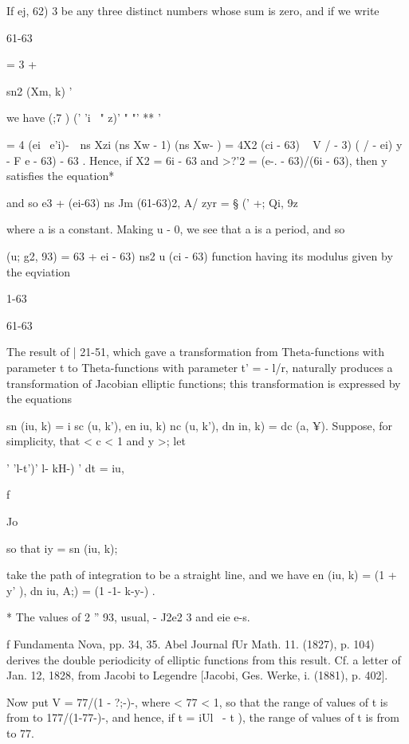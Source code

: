 If ej, 62) 3 be any three distinct numbers whose sum is
zero, and if we write

61-63

  = 3 +

sn2 (Xm, k) '

we have (;7 ) (' 'i ~" z)' " "' ** '

= 4 (ei ~e'i)-\ \ ns Xzi (ns Xw - 1) (ns Xw- ) = 4X2 (ci - 63) ~ V / -
3) ( / - ei) y - F e - 63) - 63 . Hence, if X2 = 6i - 63 and >?'2 =
(e-. - 63)/(6i - 63), then y satisfies the equation*

and so e3 + (ei-63) ns Jm (61-63)2, A/ zyr = § (' +; Qi, 9z\

where a is a constant. Making u - 0, we see that a is a period, and so

  (u; g2, 93) = 63 + ei - 63) ns2 u (ci - 63)%
function having its modulus given by the eqviation

1-63

61-63

The result of | 21-51, which gave a transformation from
Theta-functions with parameter t to Theta-functions with parameter t'
= - l/r, naturally produces a transformation of Jacobian elliptic
functions; this transformation is expressed by the equations

sn (iu, k) = i sc (u, k'), en iu, k) nc (u, k'), dn in, k) = dc (a,
¥). Suppose, for simplicity, that < c < 1 and y >; let

' 'l-t')' l- kH-) ' dt = iu,

f

Jo

so that iy = sn (iu, k);

take the path of integration to be a straight line, and we have en
(iu, k) = (1 + y' ), dn iu, A;) = (1 -1- k-y-) .

* The values of 2 '' 93, usual, - J2e2 3 and eie e-s.

f Fundamenta Nova, pp. 34, 35. Abel Journal fUr Math. 11. (1827), p.
104) derives the double periodicity of elliptic functions from this
result. Cf. a letter of Jan. 12, 1828, from Jacobi to Legendre
[Jacobi, Ges. Werke, i. (1881), p. 402].

%
%

Now put V = 77/(1 - ?;-)-, where < 77 < 1, so that the range of values
of t is from to 177/(1-77-)-, and hence, if t = iUl \ - t ), the
range of values of t is from to 77.

